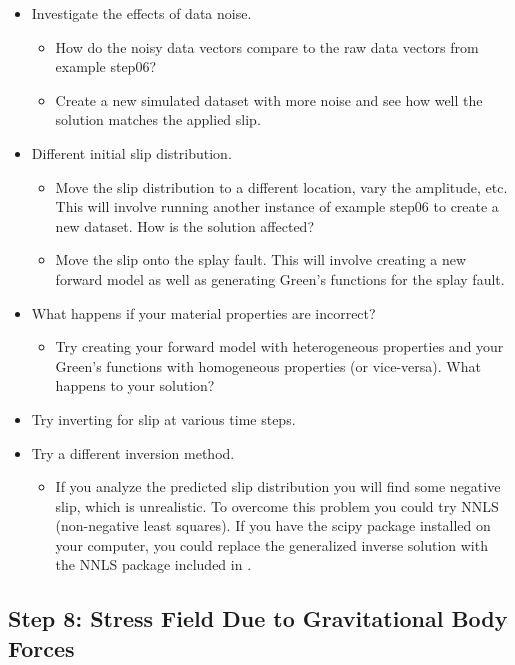 \begin{itemize}
\item Investigate the effects of data noise.
  \begin{itemize}
  \item How do the noisy data vectors compare to the raw data vectors
    from example step06?
  \item Create a new simulated dataset with more noise and see how
    well the solution matches the applied slip.
  \end{itemize}
\item Different initial slip distribution.
  \begin{itemize}
  \item Move the slip distribution to a different location, vary the
    amplitude, etc. This will involve running another instance of example
    step06 to create a new dataset. How is the solution affected?
  \item Move the slip onto the splay fault. This will involve creating
    a new forward model as well as generating Green's functions for the
    splay fault.
  \end{itemize}
\item What happens if your material properties are incorrect?
  \begin{itemize}
  \item Try creating your forward model with heterogeneous properties
    and your Green's functions with homogeneous properties (or
    vice-versa). What happens to your solution?
  \end{itemize}
\item Try inverting for slip at various time steps.
\item Try a different inversion method.
  \begin{itemize}
  \item If you analyze the predicted slip distribution you will find
    some negative slip, which is unrealistic. To overcome this problem
    you could try NNLS (non-negative least squares). If you have the
    scipy package installed on your computer, you could replace the
    generalized inverse solution with the NNLS package included in
    .
  \end{itemize}
\end{itemize}

\subsection{Step 8: Stress Field Due to Gravitational Body Forces}

